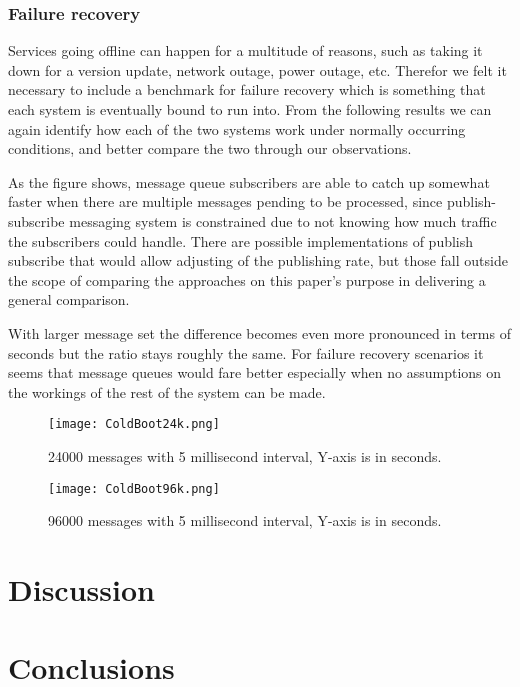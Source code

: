 \documentclass[conference]{IEEEtran}
\begin{document}
\subsubsection{Failure recovery}
Services going offline can happen for a multitude of reasons, such as taking it down for a version update, network outage, power outage, etc. Therefor we felt it necessary to include a benchmark for failure recovery which is something that each system is eventually bound to run into. From the following results we can again identify how each of the two systems work under normally occurring conditions, and better compare the two through our observations.

As the figure shows, message queue subscribers are able to catch up somewhat faster when there are multiple messages pending to be processed, since publish-subscribe messaging system is constrained due to not knowing how much traffic the subscribers could handle. There are possible implementations of publish subscribe that would allow adjusting of the publishing rate, but those fall outside the scope of comparing the approaches on this paper's purpose in delivering a general comparison.

With larger message set the difference becomes even more pronounced in terms of seconds but the ratio stays roughly the same. For failure recovery scenarios it seems that message queues would fare better especially when no assumptions on the workings of the rest of the system can be made.

\begin{figure}
    \centering
    \texttt{[image: ColdBoot24k.png]}
    \caption{24000 messages with 5 millisecond interval, Y-axis is in seconds.}
\end{figure}

\begin{figure}
    \centering
    \texttt{[image: ColdBoot96k.png]}
    \caption{96000 messages with 5 millisecond interval, Y-axis is in seconds.}
\end{figure}

\section{Discussion}

\section{Conclusions}
\end{document}
